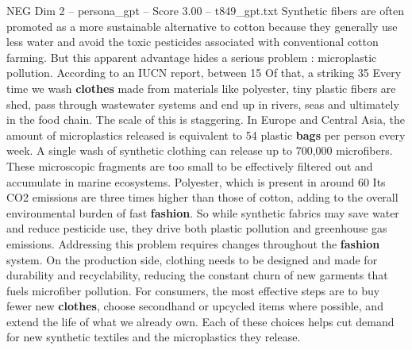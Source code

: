\begin{textsample}{NEG Dim 2 – persona\_gpt – Score 3.00 – t849\_gpt.txt}  \label{ex:f2_neg_043}
Synthetic fibers are often promoted as a more sustainable alternative to cotton because they generally use less water and avoid the toxic pesticides associated with conventional cotton farming.
But this apparent advantage hides a serious problem : microplastic pollution.
According to an IUCN report, between 15 %
Of that, a striking 35 %
Every time we wash \textbf{clothes} made from materials like polyester, tiny plastic fibers are shed, pass through wastewater systems and end up in rivers, seas and ultimately in the food chain.
The scale of this is staggering.
In Europe and Central Asia, the amount of microplastics released is equivalent to 54 plastic \textbf{bags} per person every week.
A single wash of synthetic clothing can release up to 700,000 microfibers.
These microscopic fragments are too small to be effectively filtered out and accumulate in marine ecosystems.
Polyester, which is present in around 60 %
Its CO2 emissions are three times higher than those of cotton, adding to the overall environmental burden of fast \textbf{fashion}.
So while synthetic fabrics may save water and reduce pesticide use, they drive both plastic pollution and greenhouse gas emissions.
Addressing this problem requires changes throughout the \textbf{fashion} system.
On the production side, clothing needs to be designed and made for durability and recyclability, reducing the constant churn of new garments that fuels microfiber pollution.
For consumers, the most effective steps are to buy fewer new \textbf{clothes}, choose secondhand or upcycled items where possible, and extend the life of what we already own.
Each of these choices helps cut demand for new synthetic textiles and the microplastics they release.

\end{textsample}
